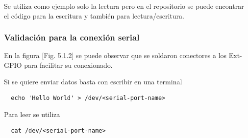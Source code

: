 \documentclass[12pt]{article}
\begin{document}


Se utiliza como ejemplo solo la lectura pero en el repositorio se puede encontrar el código para la escritura y también para lectura/escritura.

\subsubsection{Validación para la conexión serial}

En la figura [Fig. 5.1.2] se puede observar que se soldaron conectores a los Ext-GPIO para facilitar su conexionado.

Si se quiere enviar datos basta con escribir en una terminal
\lstset{language=Bash}
\begin{lstlisting}
  echo 'Hello World' > /dev/<serial-port-name>
\end{lstlisting}

Para leer se utiliza
\begin{lstlisting}
  cat /dev/<serial-port-name>
\end{lstlisting}
\end{document}
